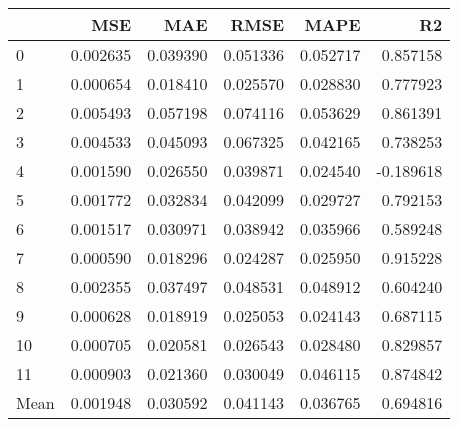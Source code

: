 \begin{tabular}{lrrrrr}
\toprule
 & MSE & MAE & RMSE & MAPE & R2 \\
\midrule
0 & 0.002635 & 0.039390 & 0.051336 & 0.052717 & 0.857158 \\
1 & 0.000654 & 0.018410 & 0.025570 & 0.028830 & 0.777923 \\
2 & 0.005493 & 0.057198 & 0.074116 & 0.053629 & 0.861391 \\
3 & 0.004533 & 0.045093 & 0.067325 & 0.042165 & 0.738253 \\
4 & 0.001590 & 0.026550 & 0.039871 & 0.024540 & -0.189618 \\
5 & 0.001772 & 0.032834 & 0.042099 & 0.029727 & 0.792153 \\
6 & 0.001517 & 0.030971 & 0.038942 & 0.035966 & 0.589248 \\
7 & 0.000590 & 0.018296 & 0.024287 & 0.025950 & 0.915228 \\
8 & 0.002355 & 0.037497 & 0.048531 & 0.048912 & 0.604240 \\
9 & 0.000628 & 0.018919 & 0.025053 & 0.024143 & 0.687115 \\
10 & 0.000705 & 0.020581 & 0.026543 & 0.028480 & 0.829857 \\
11 & 0.000903 & 0.021360 & 0.030049 & 0.046115 & 0.874842 \\
Mean & 0.001948 & 0.030592 & 0.041143 & 0.036765 & 0.694816 \\
\bottomrule
\end{tabular}

